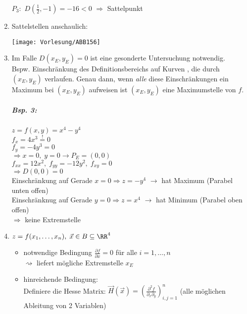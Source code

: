\begin{enumerate}
\begin{anumerate}
$P_3:$ $D(\tfrac{1}{2},-1)=-16<0$ $\Rightarrow$ Sattelpunkt
\end{anumerate}
\item Sattelstellen anschaulich:
\begin{center}
\texttt{[image: Vorlesung/ABB156]}
\end{center}
\item Im Falle $D(x_E, y_E)=0$ ist eine gesonderte Untersuchung notwendig.\\
Bspw. Einschränkung des Definitionsbereichs auf Kurven , die durch $(x_E, y_E)$ verlaufen. Genau dann, wenn \emph{alle} diese Einschränkungen ein Maximum bei $(x_E, y_E)$ aufweisen ist $(x_E, y_E)$ eine Maximumstelle von $f$.

\subparagraph{Bsp. 3:} $z=f(x,y)=x^4-y^4$\\
$f_x=4x^3\overset{!}{=}0$\\
$f_y=-4y^3 = 0$\\
$\Rightarrow x=0, \; y=0 \to P_E=(0,0)$\\
$f_{xx}=12x^2, \; f_{yy}=-12y^2, \; f_{xy}=0$\\
$\Rightarrow D(0,0)=0$\\
Einschränkung auf Gerade $x=0 \Rightarrow z=-y^4$ $\to$ hat Maximum (Parabel unten offen)\\
Einschränknug auf Gerade $y=0 \Rightarrow z = x^4$ $\to$ hat Minimum (Parabel oben offen)\\
$\Rightarrow$ keine Extremstelle
\item $z=f(x_1, \dots, x_n), \; \vec{x} \in B \subseteq \RR^4$
\begin{itemize}
\item notwendige Bedingung $\frac{\partial f}{\partial x}=0$ für alle $i=1,\dots, n$\\
$\rightsquigarrow$ liefert mögliche Extremstelle $x_E$
\item hinreichende Bedingung: \\
Definiere die Hesse Matrix: $\vec{H}(\vec{x})=\left(\frac{\partial ^2 f}{\partial_x\partial_y}\right)_{i,j=1}^n$ (alle möglichen Ableitung von 2 Variablen)
\end{itemize}
\end{enumerate}
